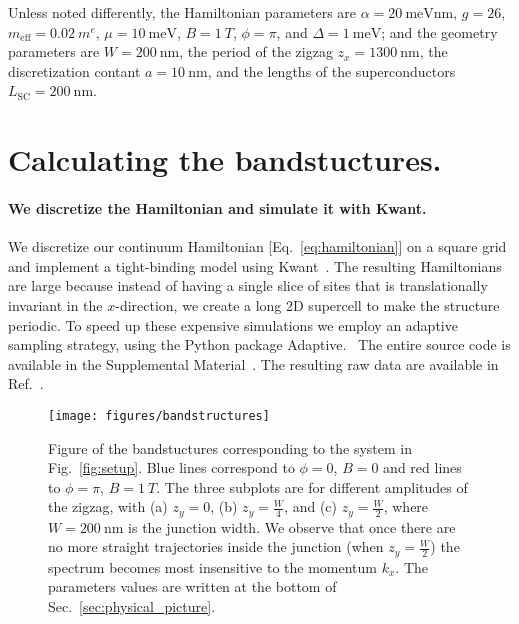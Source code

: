 \documentclass[english, twocolumn, 10pt, aps, superscriptaddress, floatfix, prb, citeautoscript]{revtex4-1}
\newcommand{\meff}{m_\text{eff}}
\renewcommand{\comment}[2]{#2}
\renewcommand{\comment}{\paragraph}
\begin{document}
Unless noted differently, the Hamiltonian parameters are $\alpha=\SI{20}{\meV \nm}$, $g=26$, $\meff=\SI{0.02}{\electronmass}$, $\mu=\SI{10}{\meV}$, $B=\SI{1}{T}$, $\phi=\pi$, and $\Delta=\SI{1}{\meV}$; and the geometry parameters are $W=\SI{200}{\nm}$, the period of the zigzag $z_x=\SI{1300}{\nm}$, the discretization contant $a=\SI{10}{\nm}$, and the lengths of the superconductors $L_\textrm{SC}=\SI{200}{\nm}$.  %

\section{Calculating the bandstuctures.}\label{sec:bandstuctures}

\comment{We discretize the Hamiltonian and simulate it with Kwant.}
We discretize our continuum Hamiltonian [Eq.~\eqref{eq:hamiltonian}] on a square grid and implement a tight-binding model using Kwant~\cite{groth_kwant:_2014}.
The resulting Hamiltonians are large because instead of having a single slice of sites that is translationally invariant in the $x$-direction, we create a long 2D supercell to make the structure periodic.
To speed up these expensive simulations we employ an adaptive sampling strategy, using the Python package Adaptive.~\cite{adaptive}
The entire source code is available in the Supplemental Material~\cite{supp}.  %
The resulting raw data are available in Ref.~.  %

\begin{figure}[!htb]
\texttt{[image: figures/bandstructures]}
\caption{Figure of the bandstuctures corresponding to the system in Fig.~\ref{fig:setup}.
Blue lines correspond to $\phi=0$, $B=0$ and red lines to $\phi=\pi$, $B = \SI{1}{T}$.
The three subplots are for different amplitudes of the zigzag, with (a) $z_y=0$, (b) $z_y=\frac{W}{4}$, and (c) $z_y=\frac{W}{2}$, where $W=\SI{200}{\nm}$ is the junction width.
We observe that once there are no more straight trajectories inside the junction (when $z_y=\frac{W}{2}$) the spectrum becomes most insensitive to the momentum $k_x$.
The parameters values are written at the bottom of Sec.~\ref{sec:physical_picture}.\label{fig:bandstuctures}}
\end{figure}
\end{document}
